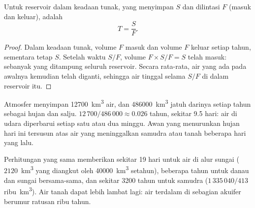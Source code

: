 \begin{proposition}\label{prop:g10:freshwater-resources:residence}
Untuk reservoir dalam keadaan tunak, yang menyimpan  $S$ dan dilintasi
 $F$ (masuk dan keluar),  adalah
\[
T = \frac{S}{F}.
\]
\end{proposition}

\begin{proof}
Dalam keadaan tunak, volume $F$ masuk dan volume $F$ keluar setiap tahun,
sementara  tetap $S$. Setelah waktu $S/F$, volume $F \times S/F = S$
telah masuk: sebanyak yang ditampung seluruh reservoir. Secara rata-rata, air
yang ada pada awalnya kemudian telah diganti, sehingga air tinggal selama $S/F$
di dalam reservoir itu.
\end{proof}

\begin{example}\label{ex:g10:freshwater-resources:atmosphere}
Atmosfer menyimpan \num{12700}~\unit{km^3} air, dan \num{486000}~\unit{km^3}
jatuh darinya setiap tahun sebagai hujan dan salju. 
$12\,700/486\,000 \approx \num{0.026}$ tahun, sekitar \num{9.5} hari: air di
udara diperbarui setiap satu atau dua minggu. Awan yang menurunkan hujan hari
ini tersusun atas air yang meninggalkan samudra atau tanah beberapa hari yang
lalu.
\end{example}

Perhitungan yang sama memberikan sekitar \num{19} hari untuk air di alur
sungai ($2120$~\unit{km^3} yang diangkut oleh \num{40000}~\unit{km^3}
setahun), beberapa tahun untuk danau dan sungai bersama-sama, dan sekitar
\num{3200} tahun untuk samudra ($1\,335\,040/413$ ribu~\unit{km^3}). Air
tanah dapat lebih lambat lagi: air terdalam di sebagian akuifer berumur
ratusan ribu tahun.

